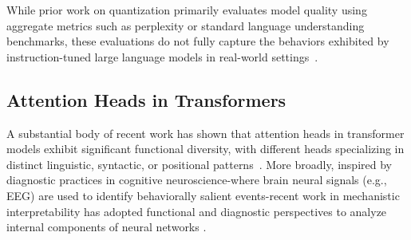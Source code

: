 While prior work on quantization primarily evaluates model quality using aggregate metrics such as perplexity or standard language understanding benchmarks, these evaluations do not fully capture the behaviors exhibited by instruction-tuned large language models in real-world settings~\citep{jin2024comprehensive, xia-etal-2023-training}.
\subsection{Attention Heads in Transformers}

A substantial body of recent work has shown that attention heads in transformer models exhibit significant functional diversity, with different heads specializing in distinct linguistic, syntactic, or positional patterns~\citep{voita2019analyzing,clark2019does,rai2024practical}. More broadly, inspired by diagnostic practices in cognitive neuroscience-where brain neural signals (e.g., EEG) are used to identify behaviorally salient events-recent work in mechanistic interpretability has adopted functional and diagnostic perspectives to analyze internal components of neural networks \citep{kriegeskorte2008representational, nanda2023progress}. 




